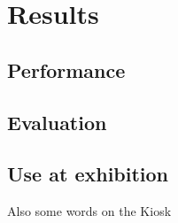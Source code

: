 \chapter{Results} 

\label{Chapter7} 


\section{Performance}
\section{Evaluation}
\section{Use at exhibition} 

Also some words on the Kiosk